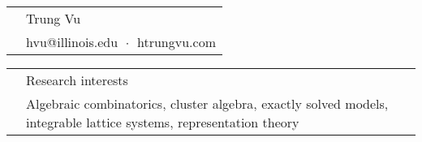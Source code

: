 \documentclass[letterpaper, 11pt]{article}
\newcommand{\headingfont}{\Large\color{Red}}
\newenvironment{SectionTable}[1]{
	\renewcommand*{\arraystretch}{1.7}
	\setlength{\tabcolsep}{10pt}
	\begin{longtable}{Rp{5.2in}} & #1 \\}
	{\end{longtable}\vspace{-.3cm}}
\begin{document}
	
	
	\begin{SectionTable}{\Huge Trung Vu} & 
		hvu@illinois.edu   $\;\boldsymbol{\cdot}\;$ 
		htrungvu.com 
	\end{SectionTable}
	
	
	\begin{SectionTable}{\headingfont Research interests}
		& Algebraic combinatorics, cluster algebra, exactly solved models, integrable lattice systems, representation theory 
	\end{SectionTable}
	
		
		
	
	
\end{document}
